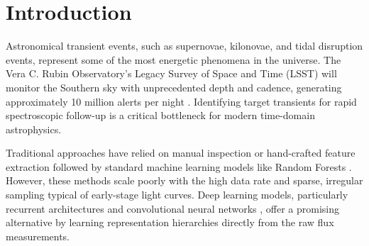 \section{Introduction}
Astronomical transient events, such as supernovae, kilonovae, and tidal disruption events, represent some of the most energetic phenomena in the universe. The Vera C. Rubin Observatory's Legacy Survey of Space and Time (LSST) will monitor the Southern sky with unprecedented depth and cadence, generating approximately 10 million alerts per night \cite{rubin2019}. Identifying target transients for rapid spectroscopic follow-up is a critical bottleneck for modern time-domain astrophysics.

Traditional approaches have relied on manual inspection or hand-crafted feature extraction followed by standard machine learning models like Random Forests \cite{narayan2018}. However, these methods scale poorly with the high data rate and sparse, irregular sampling typical of early-stage light curves. Deep learning models, particularly recurrent architectures \cite{charnock2017} and convolutional neural networks \cite{pasquet2019}, offer a promising alternative by learning representation hierarchies directly from the raw flux measurements.
